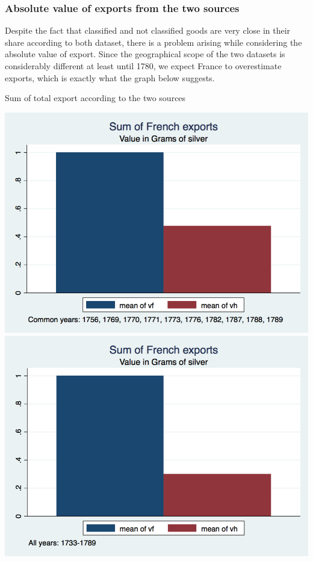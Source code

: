 \documentclass[12pt,a4paper,titlepage,english]{article}
\begin{document}
\subsubsection{Absolute value of exports from the two sources}
Despite the fact that classified and not classified goods are very close in their share according to both dataset, there is a problem arising while considering the absolute value of export. Since the geographical scope of the two datasets is considerably different at least until 1780, we expect France to overestimate exports, which is exactly what the graph below suggests.
\caption{Sum of total export according to the two sources}
\includegraphics[scale=.28]{value_total_fr_hb_commonyears.png}
\includegraphics[scale=.28]{value_total_fr_hb.png}
\end{document}
